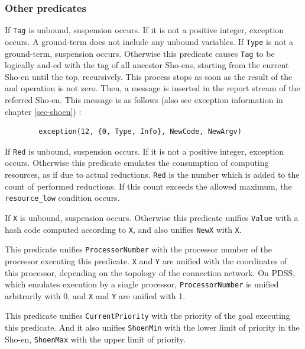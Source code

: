 \subsubsection{Other predicates}
\begin{itemize}

If \verb|Tag| is unbound, suspension occurs.
If it is not a positive integer, exception occurs.
A ground-term does not include any unbound variables.
If \verb|Type| is not a ground-term, suspension occurs. Otherwise
this predicate causes \verb|Tag| to be logically and-ed with the tag of all
ancestor Sho-ens, starting from the current Sho-en until the top, recursively.
This process stops as soon as the result of the and operation is not zero.
Then, a message is inserted in the report stream of the referred Sho-en.
This message is as follows
(also see exception information in chapter \ref{sec-shoen}) : 
\begin{verbatim}
        exception(12, {0, Type, Info}, NewCode, NewArgv)
\end{verbatim}

If \verb|Red| is unbound, suspension occurs.
If it is not a positive integer, exception occurs.
Otherwise this predicate emulates the consumption of computing resources,
as if due to actual reductions.
\verb|Red| is the number which is added to the count of performed reductions.
If this count exceeds the allowed maximum,
the \verb|resource_low| condition occurs.

If \verb|X| is unbound, suspension occurs.
Otherwise this predicate unifies \verb|Value| with a hash code computed
according to \verb|X|, and also unifies \verb|NewX| with \verb|X|.

This predicate unifies \verb|ProcessorNumber| with the processor number of the
processor executing this predicate.
\verb|X| and \verb|Y| are unified with the coordinates of this processor,
depending on the topology of the connection network.
On PDSS, which emulates execution by a single processor,
\verb|ProcessorNumber| is unified arbitrarily with 0, and
\verb|X| and \verb|Y| are unified with 1.

This predicate unifies \verb|CurrentPriority| with the priority of the goal
executing this predicate.
And it also unifies \verb|ShoenMin| with the lower limit of priority
in the Sho-en, \verb|ShoenMax| with the upper limit of priority.

\end{itemize}


